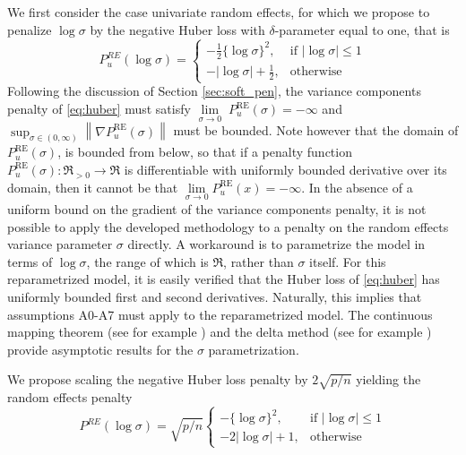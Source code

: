 \documentclass[11pt, a4paper]{article}
\newcommand{\vnorm}[1]{\ensuremath{{\left\| #1 \right\|}}}
\theoremstyle{example} \newtheorem{example}{Example}[section]
\theoremstyle{theorem} \newtheorem{theorem}{Theorem}[section]
\begin{document}
We first consider the case univariate random effects, for which we propose to penalize $\log\sigma$ by the negative Huber loss with $\delta$-parameter equal to one, that is 
\begin{equation} \label{eq:huber}
P_u^{\textit{RE}}(\log\sigma) = \begin{cases}
-\frac{1}{2} \{\log \sigma\}^2, & \text{if } |\log \sigma|\leq 1 \\ 
- |\log \sigma| + \frac{1}{2}, & \text{otherwise}
\end{cases}
\end{equation}
Following the discussion of Section \ref{sec:soft_pen}, the variance components penalty of \eqref{eq:huber} must satisfy $\lim\limits_{\sigma \to 0} \; P_u^{\text{RE}}(\sigma) = -\infty$ and $\sup_{\sigma \in (0,\infty) } \vnorm{\nabla P_u^{\text{RE}}(\sigma)}$ must be bounded. Note however that the domain of $P^{\text{RE}}_u(\sigma)$, is bounded from below, so that if a penalty function $P^{\text{RE}}_u(\sigma):\Re_{>0} \to \Re$ is differentiable with uniformly bounded derivative over its domain, then it cannot be that $\lim\limits_{\sigma \to 0}P^{\text{RE}}_u(x) = -\infty$. In the absence of a uniform bound on the gradient of the variance components penalty, it is not possible to apply the developed methodology to a penalty on the random effects variance parameter $\sigma$ directly. A workaround is to parametrize the model in terms of $\log\sigma$, the range of which is $\Re$, rather than $\sigma$ itself. For this reparametrized model, it is easily verified that the Huber loss of \eqref{eq:huber} has uniformly bounded first and second derivatives. Naturally, this implies that assumptions A0-A7 must apply to the reparametrized model. The continuous mapping theorem (see for example  \citet[Theorem. 2.3]{vaart1998asymptotic}) and the delta method (see for example \citet[Chapter 3]{vaart1998asymptotic}) provide asymptotic results for the $\sigma$ parametrization. 

We propose scaling the negative Huber loss penalty by $2\sqrt{p/n}$ yielding the random effects penalty 
\begin{equation} \label{eq:scaled_huber}
P^{\textit{RE}}(\log\sigma) = \sqrt{p/n}\begin{cases}
- \{\log \sigma\}^2, & \text{if } |\log \sigma|\leq 1 \\ 
- 2|\log \sigma| + 1, & \text{otherwise}
\end{cases}
\end{equation}
\end{document}
